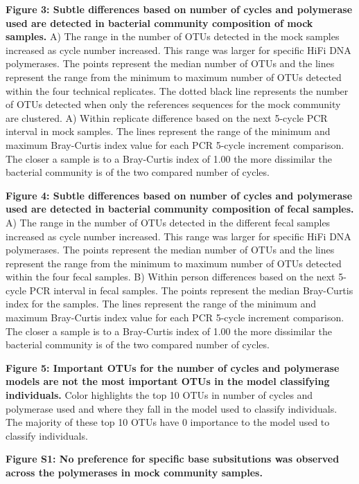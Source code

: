\documentclass[11pt,]{article}
\begin{document}
\textbf{Figure 3: Subtle differences based on number of cycles and
polymerase used are detected in bacterial community composition of mock
samples.} A) The range in the number of OTUs detected in the mock
samples increased as cycle number increased. This range was larger for
specific HiFi DNA polymerases. The points represent the median number of
OTUs and the lines represent the range from the minimum to maximum
number of OTUs detected within the four technical replicates. The dotted
black line represents the number of OTUs detected when only the
references sequences for the mock community are clustered. A) Within
replicate difference based on the next 5-cycle PCR interval in mock
samples. The lines represent the range of the minimum and maximum
Bray-Curtis index value for each PCR 5-cycle increment comparison. The
closer a sample is to a Bray-Curtis index of 1.00 the more dissimilar
the bacterial community is of the two compared number of cycles.

\textbf{Figure 4: Subtle differences based on number of cycles and
polymerase used are detected in bacterial community composition of fecal
samples.} A) The range in the number of OTUs detected in the different
fecal samples increased as cycle number increased. This range was larger
for specific HiFi DNA polymerases. The points represent the median
number of OTUs and the lines represent the range from the minimum to
maximum number of OTUs detected within the four fecal samples. B) Within
person differences based on the next 5-cycle PCR interval in fecal
samples. The points represent the median Bray-Curtis index for the
samples. The lines represent the range of the minimum and maximum
Bray-Curtis index value for each PCR 5-cycle increment comparison. The
closer a sample is to a Bray-Curtis index of 1.00 the more dissimilar
the bacterial community is of the two compared number of cycles.

\textbf{Figure 5: Important OTUs for the number of cycles and polymerase
models are not the most important OTUs in the model classifying
individuals.} Color highlights the top 10 OTUs in number of cycles and
polymerase used and where they fall in the model used to classify
individuals. The majority of these top 10 OTUs have 0 importance to the
model used to classify individuals.

\newpage

\textbf{Figure S1: No preference for specific base subsitutions was
observed across the polymerases in mock community samples.}
\end{document}
